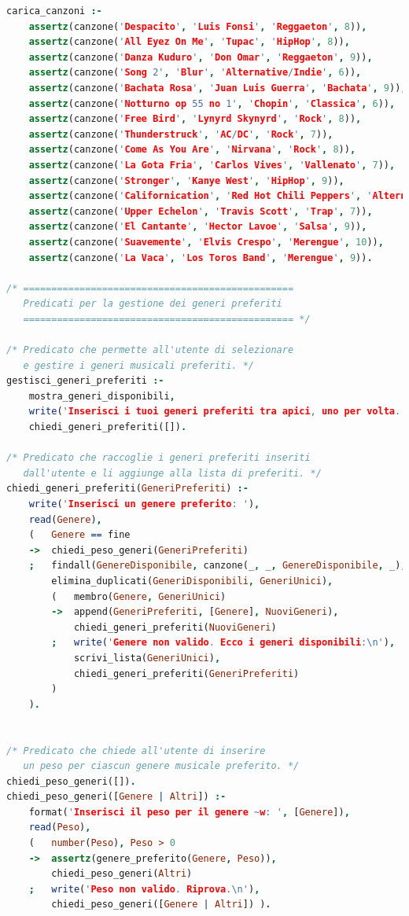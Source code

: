 \documentclass[a4paper,11pt]{article}
\begin{document}
\begin{lstlisting}[language=Prolog]
carica_canzoni :-
    assertz(canzone('Despacito', 'Luis Fonsi', 'Reggaeton', 8)),
    assertz(canzone('All Eyez On Me', 'Tupac', 'HipHop', 8)),
    assertz(canzone('Danza Kuduro', 'Don Omar', 'Reggaeton', 9)),
    assertz(canzone('Song 2', 'Blur', 'Alternative/Indie', 6)),
    assertz(canzone('Bachata Rosa', 'Juan Luis Guerra', 'Bachata', 9)),
    assertz(canzone('Notturno op 55 no 1', 'Chopin', 'Classica', 6)),
    assertz(canzone('Free Bird', 'Lynyrd Skynyrd', 'Rock', 8)),
    assertz(canzone('Thunderstruck', 'AC/DC', 'Rock', 7)),
    assertz(canzone('Come As You Are', 'Nirvana', 'Rock', 8)),
    assertz(canzone('La Gota Fria', 'Carlos Vives', 'Vallenato', 7)),
    assertz(canzone('Stronger', 'Kanye West', 'HipHop', 9)),
    assertz(canzone('Californication', 'Red Hot Chili Peppers', 'Alternative/Indie', 6)),
    assertz(canzone('Upper Echelon', 'Travis Scott', 'Trap', 7)),
    assertz(canzone('El Cantante', 'Hector Lavoe', 'Salsa', 9)),
    assertz(canzone('Suavemente', 'Elvis Crespo', 'Merengue', 10)),
    assertz(canzone('La Vaca', 'Los Toros Band', 'Merengue', 9)).

/* ================================================
   Predicati per la gestione dei generi preferiti
   ================================================ */

/* Predicato che permette all'utente di selezionare
   e gestire i generi musicali preferiti. */
gestisci_generi_preferiti :-
    mostra_generi_disponibili,
    write('Inserisci i tuoi generi preferiti tra apici, uno per volta. Scrivi "fine" per terminare.\n'),
    chiedi_generi_preferiti([]).

/* Predicato che raccoglie i generi preferiti inseriti
   dall'utente e li aggiunge alla lista di preferiti. */
chiedi_generi_preferiti(GeneriPreferiti) :-
    write('Inserisci un genere preferito: '),
    read(Genere),
    (   Genere == fine
    ->  chiedi_peso_generi(GeneriPreferiti)
    ;   findall(GenereDisponibile, canzone(_, _, GenereDisponibile, _), GeneriDisponibili),
        elimina_duplicati(GeneriDisponibili, GeneriUnici),
        (   membro(Genere, GeneriUnici)
        ->  append(GeneriPreferiti, [Genere], NuoviGeneri),
            chiedi_generi_preferiti(NuoviGeneri)
        ;   write('Genere non valido. Ecco i generi disponibili:\n'),
            scrivi_lista(GeneriUnici),
            chiedi_generi_preferiti(GeneriPreferiti)
        )
    ).


/* Predicato che chiede all'utente di inserire
   un peso per ciascun genere musicale preferito. */
chiedi_peso_generi([]).
chiedi_peso_generi([Genere | Altri]) :-
    format('Inserisci il peso per il genere ~w: ', [Genere]),
    read(Peso),
    (   number(Peso), Peso > 0
    ->  assertz(genere_preferito(Genere, Peso)),
        chiedi_peso_generi(Altri)
    ;   write('Peso non valido. Riprova.\n'),
        chiedi_peso_generi([Genere | Altri]) ).


\end{lstlisting}
\end{document}
